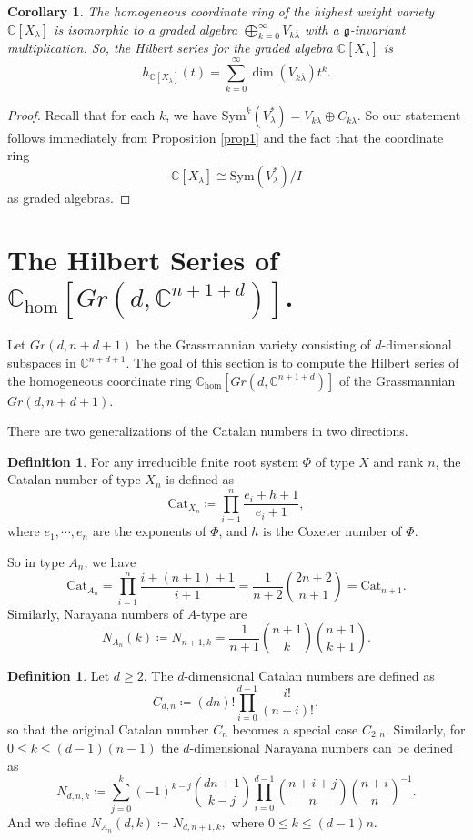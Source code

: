 \documentclass[12pt]{extarticle}
\theoremstyle{plain}
\newtheorem{coro}[theo]{Corollary}
\theoremstyle{definition}
\newtheorem{defi}[theo]{Definition}
\theoremstyle{remark}
\newcommand{\Cat}{\mathrm{Cat}}
\newcommand{\Lieg}{\mathfrak{g}}
\newcommand{\Sym}{\mathrm{Sym}}
\newcommand{\C}{\mathbb{C}}
\newcommand{\lambar}{{\overline{\lambda}}}
\begin{document}
\begin{coro}\label{Hilbert}
    The homogeneous coordinate ring of the highest weight variety $\C[X_\lambda]$ is isomorphic to a graded algebra
    $
        \bigoplus_{k=0}^{\infty}V_{k\lambar}
    $
    with a $\Lieg$-invariant multiplication. So, the Hilbert series for the graded algebra $\C[X_\lambda]$ is
    $$
        h_{\C[X_\lambda]}(t)=\sum_{k=0}^{\infty}\dim(V_{k\lambar})t^k.
    $$
\end{coro}
\begin{proof}
    Recall that for each $k$, we have $\Sym^k(V_\lambda^*)=V_{k\lambar}\oplus C_{k\lambar}.$ So our statement follows immediately from Proposition \ref{prop1} and the fact that the coordinate ring $$\C[X_\lambda]\cong\Sym(V^*_\lambda)/I$$ as graded algebras.
\end{proof}








\section{The Hilbert Series of $\C_{\mathrm{hom}}[Gr(d,\C^{n+1+d})]$.}
Let $Gr(d,n+d+1)$ be the Grassmannian variety consisting of $d$-dimensional subspaces in $\C^{n+d+1}$. The goal of this section is to compute the Hilbert series of the homogeneous coordinate ring $\C_{\mathrm{hom}}[Gr(d,\C^{n+1+d})]$ of the Grassmannian $Gr(d,n+d+1)$.

There are two generalizations of the Catalan numbers in two directions.
\begin{defi}\label{Cat}
    For any irreducible finite root system $\Phi$ of type $X$ and rank $n$, the Catalan number of type $X_n$ is defined as
$$
    \Cat_{X_n}\coloneqq\prod_{i=1}^n\frac{e_i+h+1}{e_i+1},
$$
where $e_1,\cdots,e_n$ are the exponents of $\Phi$, and $h$ is the Coxeter number of $\Phi$.
\end{defi}
So in type $A_n$, we have $$\Cat_{A_n}=\prod_{i=1}^{n}\frac{i+(n+1)+1}{i+1}=\frac{1}{n+2}\binom{2n+2}{n+1}=\Cat_{n+1}.$$
Similarly, Narayana numbers of $A$-type are
$$
    N_{A_n}(k)\coloneqq N_{n+1,k}=\frac{1}{n+1}\binom{n+1}{k}\binom{n+1}{k+1}.
$$
\begin{defi} Let $d\geq2$.
    The $d$-dimensional Catalan numbers \cite{Sulanke} are defined as
$$C_{d,n}\coloneqq(dn)!\prod_{i=0}^{d-1}\frac{i!}{(n+i)!},$$ 
so that the original Catalan number $C_n$ becomes a special case $C_{2,n}$.
    Similarly, for $0\leq k\leq(d-1)(n-1)$ the $d$-dimensional Narayana numbers \cite{Sulanke} can be defined as
$$
    N_{d,n,k}\coloneqq\sum_{j=0}^k(-1)^{k-j}\binom{dn+1}{k-j}\prod_{i=0}^{d-1}\binom{n+i+j}{n}\binom{n+i}{n}^{-1}.
$$
    And we define $N_{A_n}(d,k)\coloneqq N_{d,n+1,k},$ where $0\leq k\leq (d-1)n$.
\end{defi}
\end{document}
